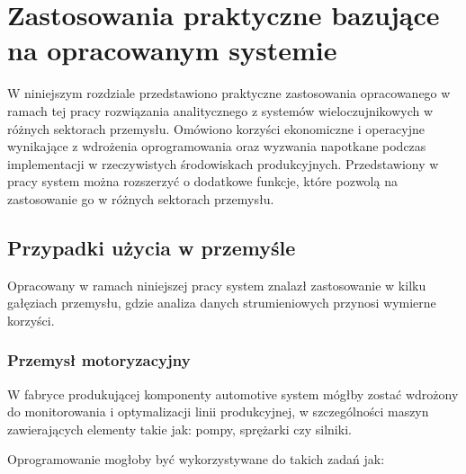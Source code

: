 \section{Zastosowania praktyczne bazujące na opracowanym systemie}
\label{sec:zastosowania_praktyczne}

W niniejszym rozdziale przedstawiono praktyczne zastosowania opracowanego w ramach tej pracy rozwiązania analitycznego z
systemów wieloczujnikowych w różnych sektorach przemysłu. Omówiono korzyści ekonomiczne i operacyjne wynikające z wdrożenia oprogramowania
oraz wyzwania napotkane podczas implementacji w rzeczywistych środowiskach produkcyjnych. Przedstawiony w pracy system można rozszerzyć o dodatkowe funkcje, które pozwolą na zastosowanie go w różnych sektorach przemysłu.

\subsection{Przypadki użycia w przemyśle}
\label{subsec:przypadki_uzycia}

Opracowany w ramach niniejszej pracy system znalazł zastosowanie w kilku gałęziach przemysłu, gdzie analiza danych strumieniowych przynosi wymierne korzyści.

\subsubsection{Przemysł motoryzacyjny}
\label{subsubsec:przemysl_motoryzacyjny}

W fabryce produkującej komponenty automotive system mógłby zostać wdrożony do monitorowania i optymalizacji linii produkcyjnej, w szczególności maszyn zawierających elementy takie jak: pompy, sprężarki czy silniki. 

\vspace{0.3em}

Oprogramowanie mogłoby być wykorzystywane do takich zadań jak:

